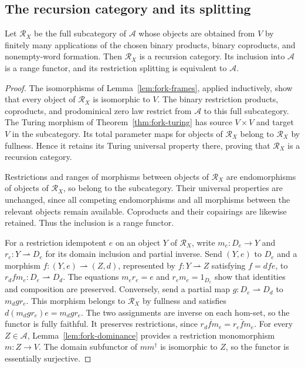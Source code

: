 \subsection{The recursion category and its splitting}

\begin{proposition}\label{prop:fork-recursion}
Let $\mathscr R_X$ be the full subcategory of $\mathcal A$
whose objects are obtained from $V$ by finitely many applications
of the chosen binary products, binary coproducts, and nonempty-word formation.
Then $\mathscr R_X$ is a recursion category. Its inclusion
into $\mathcal A$ is a range functor, and its restriction
splitting is equivalent to $\mathcal A$.
\end{proposition}
\begin{proof}
The isomorphisms of Lemma~\ref{lem:fork-frames}, applied inductively,
show that every object of $\mathscr R_X$ is isomorphic to $V$.
The binary restriction products, coproducts, and prodominical
zero law restrict from $\mathcal A$ to this full subcategory.
The Turing morphism of Theorem~\ref{thm:fork-turing} has
source $V\times V$ and target $V$ in the subcategory.
Its total parameter maps for objects of $\mathscr R_X$ belong
to $\mathscr R_X$ by fullness. Hence it retains its Turing
universal property there, proving that $\mathscr R_X$ is a
recursion category.

Restrictions and ranges of morphisms between objects of $\mathscr R_X$
are endomorphisms of objects of $\mathscr R_X$, so belong to the subcategory.
Their universal properties are unchanged, since all competing
endomorphisms and all morphisms between the relevant objects remain
available. Coproducts and their copairings are likewise retained.
Thus the inclusion is a range functor.

For a restriction idempotent $e$ on an object $Y$ of $\mathscr R_X$,
write $m_e:D_e\to Y$ and $r_e:Y\rightharpoonup D_e$ for its
domain inclusion and partial inverse. Send $(Y,e)$ to $D_e$
and a morphism $f:(Y,e)\rightharpoonup(Z,d)$, represented by
$f:Y\rightharpoonup Z$ satisfying $f=dfe$, to
$r_d f m_e:D_e\rightharpoonup D_d$.
The equations $m_er_e=e$ and $r_em_e=1_{D_e}$ show that
identities and composition are preserved. Conversely, send a
partial map $g:D_e\rightharpoonup D_d$ to $m_d g r_e$.
This morphism belongs to $\mathscr R_X$ by fullness and satisfies
$d(m_d g r_e)e=m_d g r_e$. The two assignments are inverse on
each hom-set, so the functor is fully faithful.
It preserves restrictions, since
$\overline{r_d f m_e}=r_e\bar f m_e$.
For every $Z\in\mathcal A$, Lemma~\ref{lem:fork-dominance}
provides a restriction monomorphism $m:Z\to V$.
The domain subfunctor of $mm^\dagger$ is isomorphic to $Z$,
so the functor is essentially surjective.
\end{proof}

